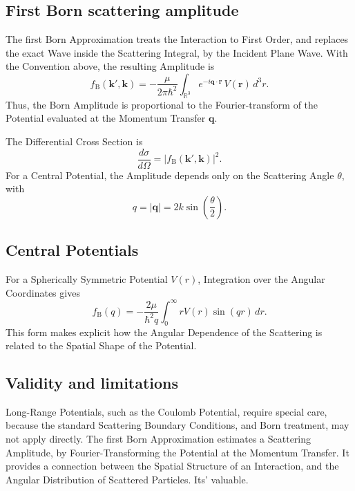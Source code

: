 \documentclass[a4paper, 10pt, onepage]{elegantbook}
\begin{document}
{\subsection{First Born scattering amplitude} 

\noindent

The first Born Approximation treats the Interaction to First Order, and replaces the exact Wave inside the Scattering 
Integral, by the
Incident Plane Wave. With the Convention above, the resulting
Amplitude is
\begin{equation}
  f_{\mathrm{B}}(\mathbf{k}',\mathbf{k})
  = -\frac{\mu}{2\pi\hbar^2}
    \int_{\mathbb{R}^3}
    e^{-i\mathbf{q}\cdot\mathbf{r}}\,
    V(\mathbf{r})\,d^3r.
\end{equation}
Thus, the Born Amplitude is proportional to the
Fourier-transform of the Potential evaluated at the Momentum Transfer $\mathbf{q}$.

The Differential Cross Section is
\begin{equation}
  \frac{d\sigma}{d\Omega}
  = \left|f_{\mathrm{B}}(\mathbf{k}',\mathbf{k})\right|^2.
\end{equation}
For a Central Potential, the Amplitude depends only on the Scattering Angle $\theta$, with
\begin{equation}
  q = |\mathbf{q}| = 2k\sin\left(\frac{\theta}{2}\right).
\end{equation}

\subsection{Central Potentials}

\noindent

For a Spherically Symmetric Potential $V(r)$, Integration over the Angular Coordinates gives
\begin{equation}
  f_{\mathrm{B}}(q)
  = -\frac{2\mu}{\hbar^2q}
    \int_0^\infty rV(r)\sin(qr)\,dr.
\end{equation}
This form makes explicit how the Angular Dependence of the Scattering is related to the Spatial Shape of the Potential.

\subsection{Validity and limitations}

\noindent

Long-Range Potentials, such as the Coulomb Potential, require special care, because the standard Scattering Boundary 
Conditions,
and Born treatment, may not apply directly.
The first Born Approximation estimates a Scattering Amplitude, by Fourier-Transforming the Potential at the Momentum 
Transfer.
It provides a connection between the Spatial Structure of an Interaction, and the Angular Distribution of Scattered 
Particles. Its' valuable.

}
\end{document}
